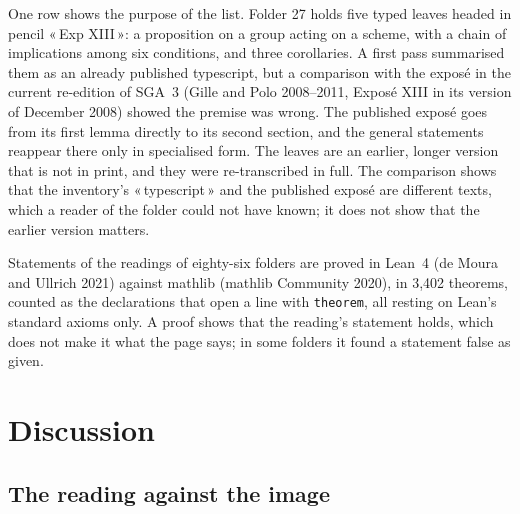 \documentclass[11pt]{article}
\newcommand{\q}[1]{«\,#1\,»}
\begin{document}
One row shows the purpose of the list. Folder 27 holds five typed leaves headed in pencil \q{Exp XIII}: a proposition on a group acting on a scheme, with a chain of implications among six conditions, and three corollaries. A first pass summarised them as an already published typescript, but a comparison with the exposé in the current re-edition of SGA~3 (Gille and Polo 2008--2011, Exposé XIII in its version of December 2008) showed the premise was wrong. The published exposé goes from its first lemma directly to its second section, and the general statements reappear there only in specialised form. The leaves are an earlier, longer version that is not in print, and they were re-transcribed in full. The comparison shows that the inventory's \q{typescript} and the published exposé are different texts, which a reader of the folder could not have known; it does not show that the earlier version matters.

Statements of the readings of eighty-six folders are proved in Lean~4 (de Moura and Ullrich 2021) against mathlib (mathlib Community 2020), in 3,402 theorems, counted as the declarations that open a line with \texttt{theorem}, all resting on Lean's standard axioms only. A proof shows that the reading's statement holds, which does not make it what the page says; in some folders it found a statement false as given.

\section{Discussion}

\subsection{The reading against the image}
\end{document}
